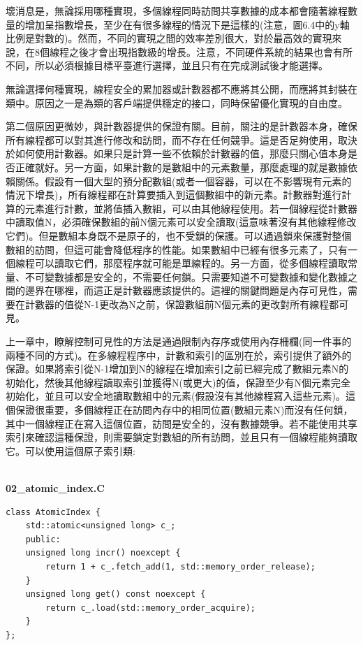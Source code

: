 壞消息是，無論採用哪種實現，多個線程同時訪問共享數據的成本都會隨著線程數量的增加呈指數增長，至少在有很多線程的情況下是這樣的(注意，圖6.4中的y軸比例是對數的)。然而，不同的實現之間的效率差別很大，對於最高效的實現來說，在8個線程之後才會出現指數級的增長。注意，不同硬件系統的結果也會有所不同，所以必須根據目標平臺進行選擇，並且只有在完成測試後才能選擇。

無論選擇何種實現，線程安全的累加器或計數器都不應將其公開，而應將其封裝在類中。原因之一是為類的客戶端提供穩定的接口，同時保留優化實現的自由度。

第二個原因更微妙，與計數器提供的保證有關。目前，關注的是計數器本身，確保所有線程都可以對其進行修改和訪問，而不存在任何競爭。這是否足夠使用，取決於如何使用計數器。如果只是計算一些不依賴於計數器的值，那麼只關心值本身是否正確就好。另一方面，如果計數的是數組中的元素數量，那麼處理的就是數據依賴關係。假設有一個大型的預分配數組(或者一個容器，可以在不影響現有元素的情況下增長)，所有線程都在計算要插入到這個數組中的新元素。計數器對進行計算的元素進行計數，並將值插入數組，可以由其他線程使用。若一個線程從計數器中讀取值N，必須確保數組的前N個元素可以安全讀取(這意味著沒有其他線程修改它們)。但是數組本身既不是原子的，也不受鎖的保護。可以通過鎖來保護對整個數組的訪問，但這可能會降低程序的性能。如果數組中已經有很多元素了，只有一個線程可以讀取它們，那麼程序就可能是單線程的。另一方面，從多個線程讀取常量、不可變數據都是安全的，不需要任何鎖。只需要知道不可變數據和變化數據之間的邊界在哪裡，而這正是計數器應該提供的。這裡的關鍵問題是內存可見性，需要在計數器的值從N-1更改為N之前，保證數組前N個元素的更改對所有線程都可見。

上一章中，瞭解控制可見性的方法是通過限制內存序或使用內存柵欄(同一件事的兩種不同的方式)。在多線程程序中，計數和索引的區別在於，索引提供了額外的保證。如果將索引從N-1增加到N的線程在增加索引之前已經完成了數組元素N的初始化，然後其他線程讀取索引並獲得N(或更大)的值，保證至少有N個元素完全初始化，並且可以安全地讀取數組中的元素(假設沒有其他線程寫入這些元素)。這個保證很重要，多個線程正在訪問內存中的相同位置(數組元素N)而沒有任何鎖，其中一個線程正在寫入這個位置，訪問是安全的，沒有數據競爭。若不能使用共享索引來確認這種保證，則需要鎖定對數組的所有訪問，並且只有一個線程能夠讀取它。可以使用這個原子索引類:

\hspace*{\fill} \\ %
\noindent
\textbf{02\_atomic\_index.C}
\begin{lstlisting}[style=styleCXX]
class AtomicIndex {
	std::atomic<unsigned long> c_;
	public:
	unsigned long incr() noexcept {
		return 1 + c_.fetch_add(1, std::memory_order_release);
	}
	unsigned long get() const noexcept {
		return c_.load(std::memory_order_acquire);
	}
};
\end{lstlisting}

